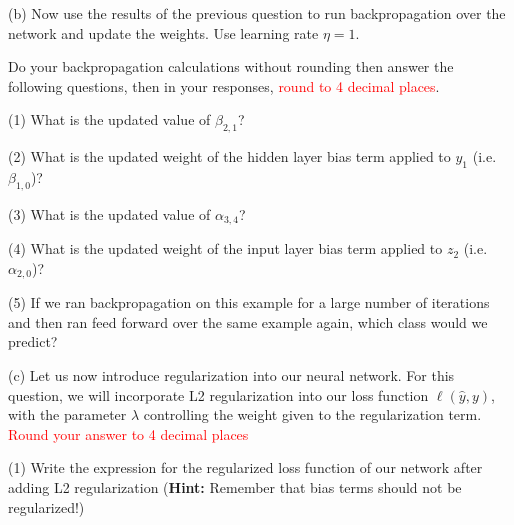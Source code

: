 (b)  Now use the results of the previous question to run backpropagation over the network and update the weights. Use learning rate $\eta=1$.

Do your backpropagation calculations without rounding then answer the following questions, then in your responses, \textcolor{red}{round to 4 decimal places}.

(1) What is the updated value of ${\beta}_{2,1}$?
\begin{tcolorbox}[fit,height=1cm, width=2cm, blank, borderline={1pt}{-2pt}]

\end{tcolorbox}

(2) What is the updated weight of the hidden layer bias term applied to $y_1$ (i.e. ${\beta}_{1,0}$)?
\begin{tcolorbox}[fit,height=1cm, width=2cm, blank, borderline={1pt}{-2pt}]

\end{tcolorbox}

(3) What is the updated value of ${\alpha}_{3,4}$?
\begin{tcolorbox}[fit,height=1cm, width=2cm, blank, borderline={1pt}{-2pt}]

\end{tcolorbox}

(4) What is the updated weight of the input layer bias term applied to $z_2$ (i.e. ${\alpha}_{2,0}$)?
\begin{tcolorbox}[fit,height=1cm, width=2cm, blank, borderline={1pt}{-2pt}]

\end{tcolorbox}

(5) If we ran backpropagation on this example for a large number of iterations and then ran feed forward over the same example again, which class would we predict?
\begin{tcolorbox}[fit,height=1cm, width=2cm, blank, borderline={1pt}{-2pt}]

\end{tcolorbox}



(c)  Let us now introduce regularization into our neural network. For this question, we will incorporate L2 regularization into our loss function $\ell(\hat{y},y)$, with the parameter $\lambda$ controlling the weight given to the regularization term. \textcolor{red}{Round your answer to 4 decimal places}

(1) Write the expression for the regularized loss function of our network after adding L2 regularization (\textbf{Hint:} Remember that bias terms should not be regularized!)
\begin{tcolorbox}[fit,height=3cm, width=10cm, blank, borderline={1pt}{-2pt}]

\end{tcolorbox}

